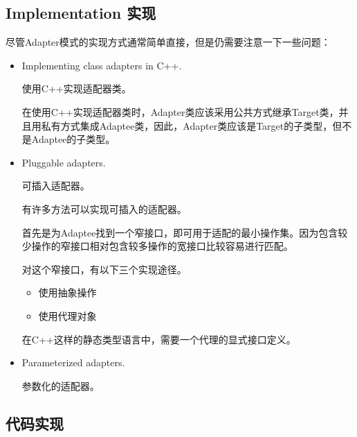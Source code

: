 \subsection{Implementation 实现}

尽管Adapter模式的实现方式通常简单直接，但是仍需要注意一下一些问题：

\begin{itemize}

	\item Implementing class adapters in C++.

	使用C++实现适配器类。

	在使用C++实现适配器类时，Adapter类应该采用公共方式继承Target类，并且用私有方式集成Adaptee类，因此，Adapter类应该是Target的子类型，但不是Adaptee的子类型。

	\item Pluggable adapters.

	可插入适配器。

	有许多方法可以实现可插入的适配器。

	首先是为Adaptee找到一个窄接口，即可用于适配的最小操作集。因为包含较少操作的窄接口相对包含较多操作的宽接口比较容易进行匹配。

	对这个窄接口，有以下三个实现途径。

	\begin{itemize}

		\item 使用抽象操作

		\item 使用代理对象

	\end{itemize}

	在C++这样的静态类型语言中，需要一个代理的显式接口定义。

	\item Parameterized adapters.

	参数化的适配器。

\end{itemize}

\subsection{代码实现}





